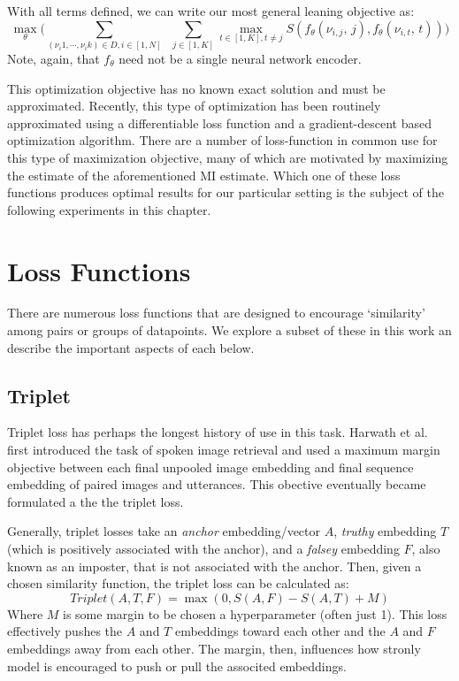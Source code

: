 With all terms defined, we can write our most general leaning objective as:
\begin{equation}
    \underset{\theta}{\max} \Big(\sum_{(\nu_i1,\cdots, \nu_ik)\in D, i\in[1,N]} \;\; \sum_{j\in[1,K]} \underset{t\in[1,K], t\neq j }{\max} S(f_\theta(\nu_{i,j}, \,j), f_\theta(\nu_{i,t}, \,t))\Big)
\end{equation}
Note, again, that $f_\theta$ need not be a single neural network encoder.

This optimization objective has no known exact solution  and must be approximated.
Recently, this type of optimization has been routinely  approximated using a differentiable loss function and a gradient-descent based optimization algorithm.
There are a number of loss-function in common use for this type of maximization objective, many of which are motivated by maximizing the estimate of the aforementioned MI estimate.
Which one of these loss functions produces optimal results for our particular setting is the subject of the following experiments in this chapter.

\section{Loss Functions}
There are numerous loss functions that are designed to encourage `similarity' among pairs or groups of datapoints.
We explore a subset of these in this work an describe the important aspects of each below.
\subsection{Triplet}
\label{section:triplet}
Triplet loss has perhaps the longest history of use in this task.
Harwath et al. \cite{harwath2015deep} first introduced the task of spoken image retrieval and used a maximum margin objective between each final unpooled image embedding and final sequence embedding of paired images and utterances.
This obective eventually became formulated a the the triplet loss.

Generally, triplet losses take an \textit{anchor} embedding/vector $A$, \textit{truthy} embedding $T$ (which is positively associated with the anchor), and a \textit{falsey} embedding $F$, also known as an imposter, that is not associated with the anchor. 
Then, given a chosen similarity function, the triplet loss can be calculated as:
\begin{equation}
\label{orig_triplet_loss}
    Triplet(A, T, F) = \max(0, S(A, F) - S(A, T) +M)
\end{equation}
Where $M$ is some margin to be chosen a hyperparameter (often just 1). 
This loss effectively pushes the $A$ and $T$ embeddings toward each other and the $A$ and $F$ embeddings away from each other.
The margin, then, influences how stronly model is encouraged to push or pull the associted embeddings.

